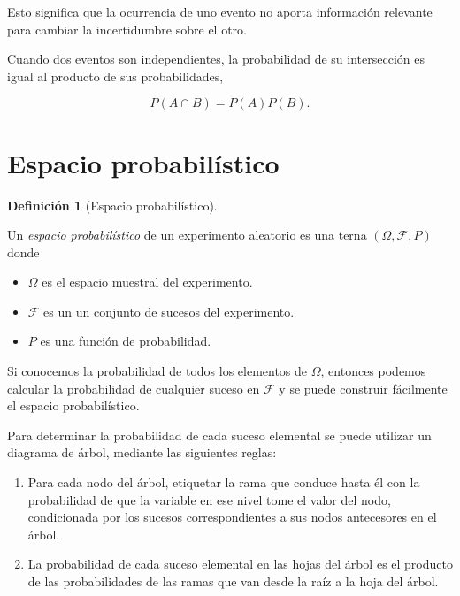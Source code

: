 \documentclass[
  a4paper,
]{scrreport}
\providecommand{\tightlist}{%
  \setlength{\itemsep}{0pt}\setlength{\parskip}{0pt}}\usepackage{longtable,booktabs,array}
\theoremstyle{plain}
\theoremstyle{definition}
\theoremstyle{definition}
\newtheorem{definition}{Definición}[chapter]
\theoremstyle{remark}
\begin{document}
Esto significa que la ocurrencia de uno evento no aporta información
relevante para cambiar la incertidumbre sobre el otro.

Cuando dos eventos son independientes, la probabilidad de su
intersección es igual al producto de sus probabilidades,

\[P(A\cap B) = P(A)P(B).\]

\section{Espacio probabilístico}\label{espacio-probabiluxedstico}

\begin{definition}[Espacio
probabilístico]\protect\hypertarget{def-espacio-probabilistico}{}\label{def-espacio-probabilistico}

Un \emph{espacio probabilístico} de un experimento aleatorio es una
terna \((\Omega,\mathcal{F},P)\) donde

\begin{itemize}
\tightlist
\item
  \(\Omega\) es el espacio muestral del experimento.
\item
  \(\mathcal{F}\) es un un conjunto de sucesos del experimento.
\item
  \(P\) es una función de probabilidad.
\end{itemize}

\end{definition}

Si conocemos la probabilidad de todos los elementos de \(\Omega\),
entonces podemos calcular la probabilidad de cualquier suceso en
\(\mathcal{F}\) y se puede construir fácilmente el espacio
probabilístico.

Para determinar la probabilidad de cada suceso elemental se puede
utilizar un diagrama de árbol, mediante las siguientes reglas:

\begin{enumerate}
\def\labelenumi{\arabic{enumi}.}
\item
  Para cada nodo del árbol, etiquetar la rama que conduce hasta él con
  la probabilidad de que la variable en ese nivel tome el valor del
  nodo, condicionada por los sucesos correspondientes a sus nodos
  antecesores en el árbol.
\item
  La probabilidad de cada suceso elemental en las hojas del árbol es el
  producto de las probabilidades de las ramas que van desde la raíz a la
  hoja del árbol.
\end{enumerate}
\end{document}
